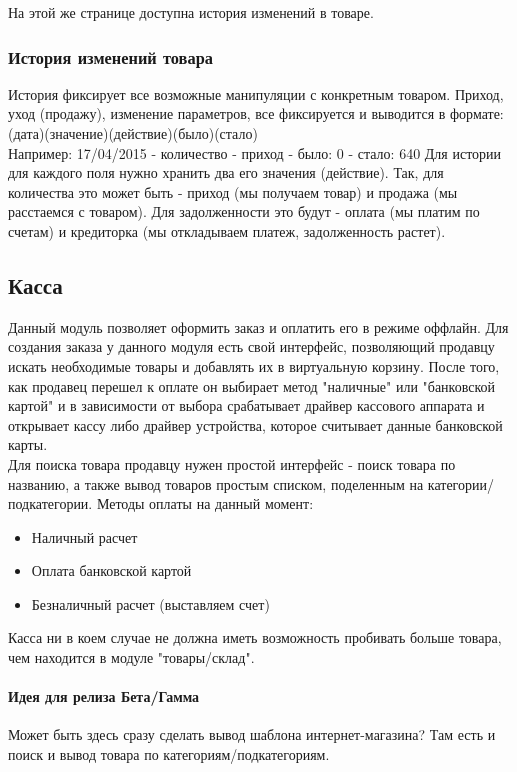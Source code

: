 \documentclass[DIV=calc, paper=a4, fontsize=11pt]{scrartcl} %
\begin{document}
На этой же странице доступна история изменений в товаре.

\subsubsection{История изменений товара}
История фиксирует все возможные манипуляции с конкретным товаром. Приход, уход (продажу), изменение параметров, все фиксируется и выводится в формате:
\\[0.5cm](дата)(значение)(действие)(было)(стало)
\\[0.5cm]Например: 17/04/2015 - количество - приход - было: 0 - стало: 640
Для истории для каждого поля нужно хранить два его значения (действие). Так, для количества это может быть - приход (мы получаем товар) и продажа (мы расстаемся с товаром). Для задолженности это будут - оплата (мы платим по счетам) и кредиторка (мы откладываем платеж, задолженность растет).

\subsection{Касса}

Данный модуль позволяет оформить заказ и оплатить его в режиме оффлайн. Для создания заказа у данного модуля есть свой интерфейс, позволяющий продавцу искать необходимые товары и добавлять их в виртуальную корзину. После того, как продавец перешел к оплате он выбирает метод "наличные" или "банковской картой" и в зависимости от выбора срабатывает драйвер кассового аппарата и открывает кассу либо драйвер устройства, которое считывает данные банковской карты.
\\[0.5cm]
Для поиска товара продавцу нужен простой интерфейс - поиск товара по названию, а также вывод товаров простым списком, поделенным на категории/подкатегории. Методы оплаты на данный момент:
\begin{itemize}
	\item Наличный расчет
	\item Оплата банковской картой
	\item Безналичный расчет (выставляем счет)
\end{itemize}

Касса ни в коем случае не должна иметь возможность пробивать больше товара, чем находится в модуле "товары/склад".
\paragraph{Идея для релиза Бета/Гамма}
Может быть здесь сразу сделать вывод шаблона интернет-магазина? Там есть и поиск и вывод товара по категориям/подкатегориям.
\end{document}

